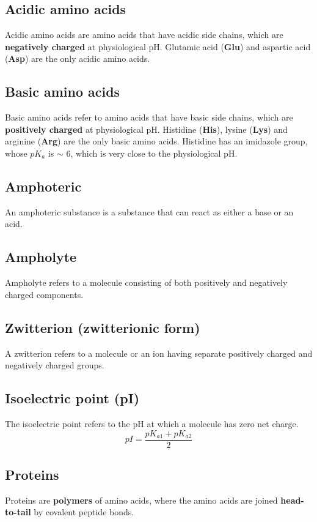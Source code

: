 \documentclass[11pt]{article}
\begin{document}
\subsection{Acidic amino acids}
\label{sec:orgb1b52b4}
Acidic amino acids are amino acids that have acidic side chains, which are \textbf{negatively charged} at physiological pH. Glutamic acid (\textbf{Glu}) and aspartic acid (\textbf{Asp}) are the only acidic amino acids.

\subsection{Basic amino acids}
\label{sec:org46df229}
Basic amino acids refer to amino acids that have basic side chains, which are \textbf{positively charged} at physiological pH. Histidine (\textbf{His}), lysine (\textbf{Lys}) and arginine (\textbf{Arg}) are the only basic amino acids. Histidine has an imidazole group, whose \(pK_a\) is \(\sim\) 6, which is very close to the physiological pH.

\subsection{Amphoteric}
\label{sec:org35de003}
An amphoteric substance is a substance that can react as either a base or an acid.

\subsection{Ampholyte}
\label{sec:orgb097793}
Ampholyte refers to a molecule consisting of both positively and negatively charged components.

\subsection{Zwitterion (zwitterionic form)}
\label{sec:orgf68c7a2}
A zwitterion refers to a molecule or an ion having separate positively charged and negatively charged groups.

\subsection{Isoelectric point (pI)}
\label{sec:org3bd7c3b}
The isoelectric point refers to the pH at which a molecule has zero net charge.
\[pI = \frac{pK_{a1} + pK_{a2}}{2}\]

\subsection{Proteins}
\label{sec:org25f217a}
Proteins are \textbf{polymers} of amino acids, where the amino acids are joined \textbf{head-to-tail} by covalent peptide bonds.
\\[0pt]
\end{document}
